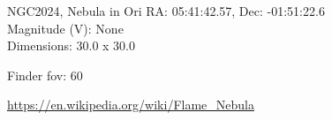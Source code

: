 \begin{block}{NGC2024, Nebula in Ori}
    RA: 05:41:42.57, Dec: -01:51:22.6 \\ 
    Magnitude (V): None \\ 
    Dimensions: 30.0 x 30.0 

    Finder fov: 60 

    \url{https://en.wikipedia.org/wiki/Flame_Nebula} 
\end{block}